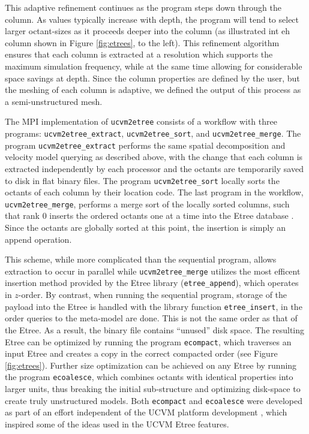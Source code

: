 This adaptive refinement continues as the program steps down through the column. As \vs{} values typically increase with depth, the program will tend to select larger octant-sizes as it proceeds deeper into the column (as illustrated int eh column shown in Figure \ref{fig:etrees}, to the left). This refinement algorithm ensures that each column is extracted at a resolution which supports the maximum simulation frequency, while at the same time allowing for considerable space savings at depth. Since the column properties are defined by the user, but the meshing of each column is adaptive, we defined the output of this process as a semi-unstructured mesh.

The MPI implementation of \texttt{ucvm2etree} consists of a workflow with three programs: \texttt{ucvm2etree\_extract}, \texttt{ucvm2etree\_sort}, and \texttt{ucvm2etree\_merge}. The program \texttt{ucvm2etree\_extract} performs the same spatial decomposition and velocity model querying as described above, with the change that each column is extracted independently by each processor and the octants are temporarily saved to disk in flat binary files. The program \texttt{ucvm2etree\_sort} locally sorts the octants of each column by their location code. The last program in the workflow, \texttt{ucvm2etree\_merge}, performs a merge sort of the locally sorted columns, such that rank 0 inserts the ordered octants one at a time into the Etree database \citep[in its natural $z$-order; see][]{Tu_2003_Tech}. Since the octants are globally sorted at this point, the insertion is simply an append operation. 

This scheme, while more complicated than the sequential program, allows extraction to occur in parallel while \texttt{ucvm2etree\_merge} utilizes the most efficent insertion method provided by the Etree library (\texttt{etree\_append}), which operates in $z$-order. By contrast, when running the sequential program, storage of the payload into the Etree is handled with the library function \texttt{etree\_insert}, in the order queries to the meta-model are done. This is not the same order as that of the Etree. As a result, the binary file contains ``unused'' disk space. The resulting Etree can be optimized by running the program \texttt{ecompact}, which traverses an input Etree and creates a copy in the correct compacted order (see Figure \ref{fig:etrees}). Further size optimization can be achieved on any Etree by running the program \texttt{ecoalesce}, which combines octants with identical properties into larger units, thus breaking the initial sub-structure and optimizing disk-space to create truly unstructured models. Both \texttt{ecompact} and \texttt{ecoalesce} were developed as part of an effort independent of the UCVM platform development \citep{Schlosser_2008_Proc}, which inspired some of the ideas used in the UCVM Etree features.
